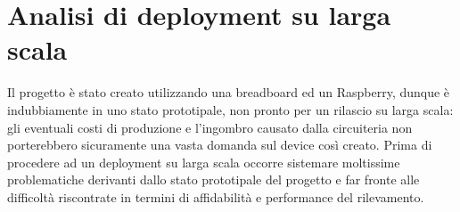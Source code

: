 \documentclass[12pt]{article}
\begin{document}

\newpage



\section{Analisi di deployment su larga scala}

Il progetto è stato creato utilizzando una breadboard ed un Raspberry, dunque è indubbiamente in uno stato prototipale, non pronto per un rilascio su larga scala: gli eventuali costi di produzione e l'ingombro causato dalla circuiteria non porterebbero sicuramente una vasta domanda sul device così creato. Prima di procedere ad un deployment su larga scala occorre sistemare moltissime problematiche derivanti dallo stato prototipale del progetto e far fronte alle difficoltà riscontrate in termini di affidabilità e performance del rilevamento.\\
\end{document}
